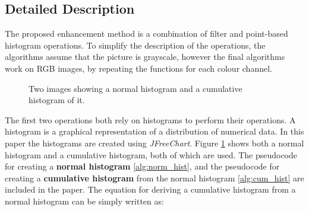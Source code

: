 \documentclass[journal,transmag]{IEEEtran}
\begin{document}
\subsection{Detailed Description}
The proposed enhancement method is a combination of filter and point-based histogram operations. To simplify the description of the operations, the algorithms assume that the picture is grayscale, however the final algorithms work on RGB images, by repeating the functions for each colour channel. 
\begin{figure}[h!] %
	\centering
	\caption{Two images showing a normal histogram and a cumulative histogram of it.}
	\label{fig:hist_comp}
\end{figure}
The first two operations both rely on histograms to perform their operations. A histogram is a graphical representation of a distribution of numerical data\cite{histDesc}\cite{histDescWiki}. In this paper the histograms are created using \textit{JFreeChart}\cite{jFreeChart}. Figure \ref{fig:hist_comp} shows both a normal histogram and a cumulative histogram, both of which are used. The pseudocode for creating a \textbf{normal histogram} \ref{alg:norm_hist}, and the pseudocode for creating a \textbf{cumulative histogram} from the normal histogram \ref{alg:cum_hist} are included in the paper. The equation for deriving a cumulative histogram from a normal histogram can be simply written as: 
\end{document}

